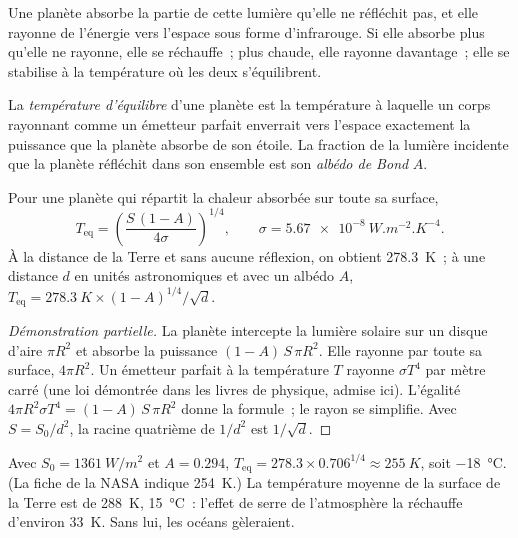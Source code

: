Une planète absorbe la partie de cette lumière qu'elle ne réfléchit pas, et
elle rayonne de l'énergie vers l'espace sous forme d'infrarouge. Si elle
absorbe plus qu'elle ne rayonne, elle se réchauffe~; plus chaude, elle
rayonne davantage~; elle se stabilise à la température où les deux
s'équilibrent.

\begin{definition}\label{def:g10:habitable-planet:equilibrium-temperature}
La \emph{température d'équilibre}
d'une planète est la température à laquelle un corps rayonnant comme un
émetteur parfait enverrait vers l'espace exactement la puissance que la
planète absorbe de son étoile. La fraction de la lumière incidente que la
planète réfléchit dans son ensemble est son \emph{albédo de Bond} $A$.
\end{definition}

\begin{proposition}\label{prop:g10:habitable-planet:teq}
Pour une planète qui répartit la chaleur absorbée sur toute sa surface,
\[
  T_{\mathrm{eq}} = \left(\frac{S\,(1-A)}{4\sigma}\right)^{1/4},
  \qquad \sigma = \qty{5.67e-8}{W.m^{-2}.K^{-4}}.
\]
À la distance de la Terre et sans aucune réflexion, on obtient
\qty{278.3}{K}~; à une distance $d$ en unités astronomiques et avec un
albédo $A$, $T_{\mathrm{eq}} = \qty{278.3}{K} \times (1-A)^{1/4}/\sqrt{d}$.
\end{proposition}

\begin{proof}[Démonstration partielle]
La planète intercepte la lumière solaire sur un disque d'aire $\pi R^2$ et
absorbe la puissance $(1-A)\,S\,\pi R^2$. Elle rayonne par toute sa
surface, $4\pi R^2$. Un émetteur parfait à la température $T$ rayonne
$\sigma T^4$ par mètre carré (une loi démontrée dans les livres de
physique, admise ici). L'égalité $4\pi R^2 \sigma T^4 = (1-A)\,S\,\pi R^2$
donne la formule~; le rayon se simplifie. Avec $S = S_0/d^2$, la racine
quatrième de $1/d^2$ est $1/\sqrt d$.
\end{proof}

\begin{example}[La Terre]\label{ex:g10:habitable-planet:earth}
Avec $S_0 = \qty{1361}{W/m^2}$ et $A = 0.294$,
$T_{\mathrm{eq}} = 278.3 \times 0.706^{1/4} \approx \qty{255}{K}$, soit
\qty{-18}{\degreeCelsius}. (La fiche de la NASA indique \qty{254}{K}.) La
température moyenne de la surface de la Terre est de \qty{288}{K},
\qty{15}{\degreeCelsius}~: l'effet de serre de l'atmosphère la réchauffe
d'environ \qty{33}{K}. Sans lui, les océans gèleraient.
\end{example}

